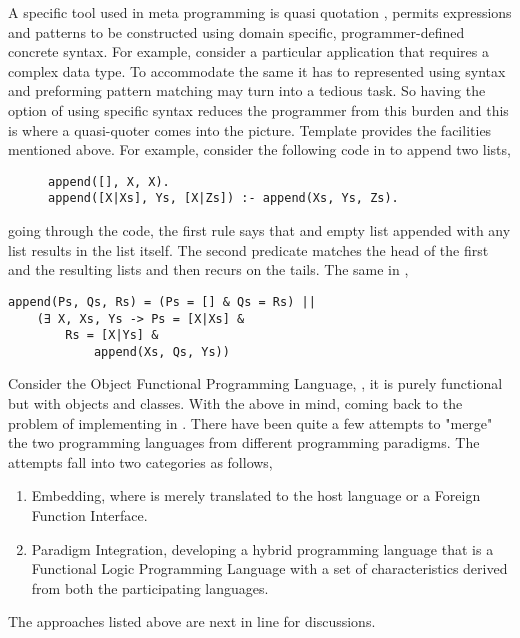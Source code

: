 \documentclass[thesis-solanki.tex]{subfiles}
\begin{document}
\par A specific tool used in meta programming is quasi quotation \cite{mainland2007s,haskellquasi,wikiquasi}, permits  expressions 
and patterns to be constructed using domain specific, programmer-defined concrete syntax. For example, consider a particular application that requires a 
complex data type. To accommodate the same it has to represented using  syntax and preforming pattern matching may turn into a 
tedious task. So having the option of using specific syntax reduces the programmer from this burden and this is where a quasi-quoter comes into the 
picture. Template  provides the facilities mentioned above. For example, consider the following code in  to append 
two lists,
\begin{figure}[h]
\begin{verbatim}
append([], X, X).
append([X|Xs], Ys, [X|Zs]) :- append(Xs, Ys, Zs).
\end{verbatim}    
\end{figure}
going through the code, the first rule says that and empty list appended with any list results in the list itself. The second predicate matches the head of the 
first and the resulting lists and then recurs on the tails. The same in ,

\begin{verbatim}
append(Ps, Qs, Rs) = (Ps = [] & Qs = Rs) ||
	(∃ X, Xs, Ys -> Ps = [X|Xs] & 
		Rs = [X|Ys] & 
			append(Xs, Qs, Ys))
\end{verbatim}  

\par Consider the Object Functional Programming Language,  \cite{website:scala}, it is purely functional but with objects 
and classes. With the above in mind, coming back to the problem of implementing  in . There have been quite a few 
attempts to "merge" the two programming languages from different programming paradigms. The attempts fall into two categories as follows,

\begin{enumerate}
\item Embedding, where  is merely translated to the host language  or a Foreign Function Interface.

\item Paradigm Integration, developing a hybrid programming language that is a Functional Logic Programming Language with a set of characteristics 
derived from both the participating languages.
\end{enumerate}

The approaches listed above are next in line for discussions.  
\end{document}
